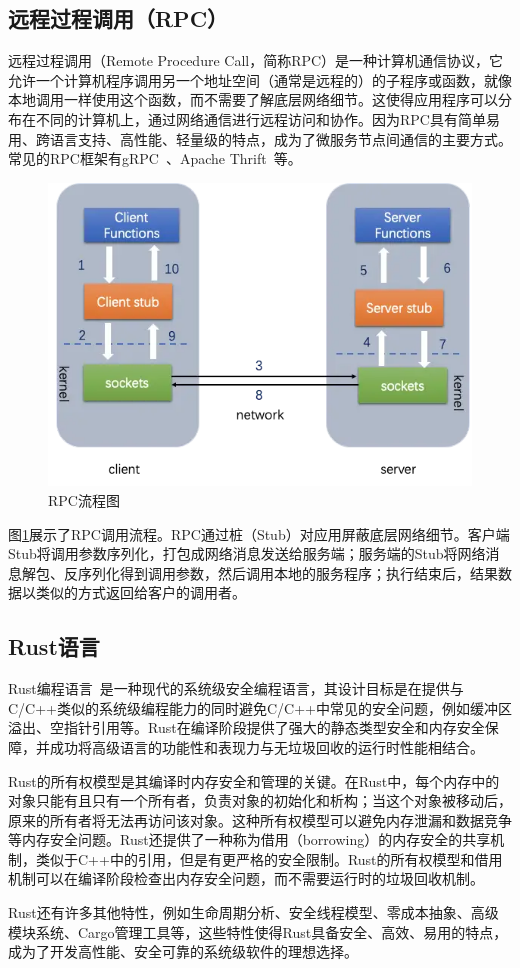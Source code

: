 \subsection{远程过程调用（RPC）}

远程过程调用（Remote Procedure Call，简称RPC）是一种计算机通信协议，它允许一个计算机程序调用另一个地址空间（通常是远程的）的子程序或函数，就像本地调用一样使用这个函数，而不需要了解底层网络细节。这使得应用程序可以分布在不同的计算机上，通过网络通信进行远程访问和协作。因为RPC具有简单易用、跨语言支持、高性能、轻量级的特点，成为了微服务节点间通信的主要方式。常见的RPC框架有gRPC~\cite{grpc}、Apache Thrift~\cite{Thrift}等。

\begin{figure}[!ht]
    \centering
    \includegraphics[width=.5\textwidth]{figures/RPC.png}
    \caption{RPC流程图}
    \label{fig:rpc}
\end{figure}

图\ref{fig:rpc}展示了RPC调用流程。RPC通过桩（Stub）对应用屏蔽底层网络细节。客户端Stub将调用参数序列化，打包成网络消息发送给服务端；服务端的Stub将网络消息解包、反序列化得到调用参数，然后调用本地的服务程序；执行结束后，结果数据以类似的方式返回给客户的调用者。

\subsection{Rust语言}

Rust编程语言~\cite{rust-lang}是一种现代的系统级安全编程语言，其设计目标是在提供与C/C++类似的系统级编程能力的同时避免C/C++中常见的安全问题，例如缓冲区溢出、空指针引用等。Rust在编译阶段提供了强大的静态类型安全和内存安全保障，并成功将高级语言的功能性和表现力与无垃圾回收的运行时性能相结合。

Rust的所有权模型是其编译时内存安全和管理的关键。在Rust中，每个内存中的对象只能有且只有一个所有者，负责对象的初始化和析构；当这个对象被移动后，原来的所有者将无法再访问该对象。这种所有权模型可以避免内存泄漏和数据竞争等内存安全问题。Rust还提供了一种称为借用（borrowing）的内存安全的共享机制，类似于C++中的引用，但是有更严格的安全限制。Rust的所有权模型和借用机制可以在编译阶段检查出内存安全问题，而不需要运行时的垃圾回收机制。

Rust还有许多其他特性，例如生命周期分析、安全线程模型、零成本抽象、高级模块系统、Cargo管理工具等，这些特性使得Rust具备安全、高效、易用的特点，成为了开发高性能、安全可靠的系统级软件的理想选择。
